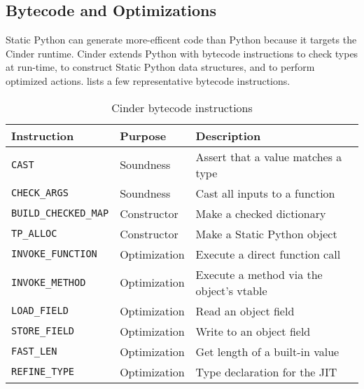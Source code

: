 \documentclass[english,cleveref,submission]{programming}
\newcommand{\SP}{Static Python}
\newcommand{\code}[1]{\texttt{#1}}
\newcommand{\bcinst}[1]{\code{#1}}
\begin{document}
\subsection{Bytecode and Optimizations}
\label{s:optimize}

\SP{} can generate more-efficent code than Python because it targets
the Cinder runtime.
Cinder extends Python with bytecode instructions to check types at run-time,
to construct \SP{} data structures, and to perform optimized actions.
 lists a few representative bytecode instructions.

\begin{table}
  \caption{Cinder bytecode instructions}
  \label{t:bytecode}

  \begin{tabular}{lll}
    {Instruction} & {Purpose} & {Description} \\\hline
    \bcinst{CAST} & Soundness & Assert that a value matches a type \\
    \bcinst{CHECK\_ARGS} & Soundness & Cast all inputs to a function \\[1ex]

    \bcinst{BUILD\_CHECKED\_MAP} & Constructor & Make a checked dictionary \\
    \bcinst{TP\_ALLOC} & Constructor & Make a \SP{} object \\[1ex]

    \bcinst{INVOKE\_FUNCTION} & Optimization & Execute a direct function call \\
    \bcinst{INVOKE\_METHOD} & Optimization & Execute a method via the object's vtable \\
    \bcinst{LOAD\_FIELD} & Optimization & Read an object field \\
    \bcinst{STORE\_FIELD} & Optimization & Write to an object field \\
    \bcinst{FAST\_LEN} & Optimization & Get length of a built-in value \\
    \bcinst{REFINE\_TYPE} & Optimization & Type declaration for the JIT \\


  \end{tabular}
\end{table}
\end{document}
